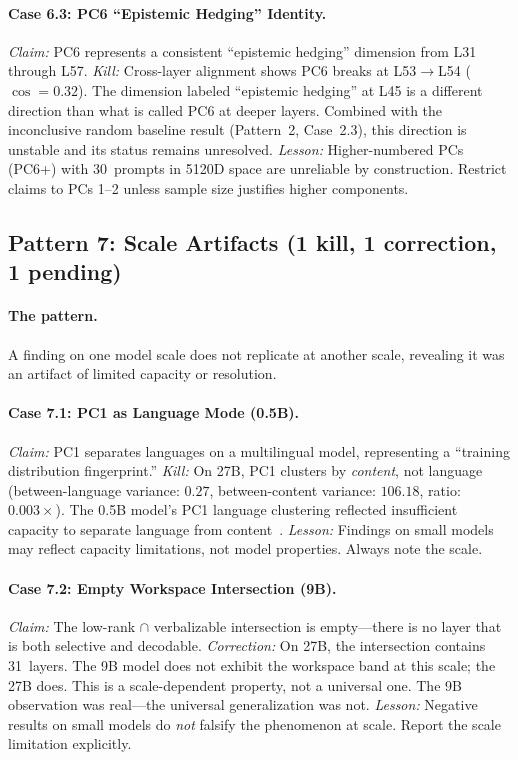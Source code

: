 \documentclass[11pt,a4paper]{article}
\begin{document}
\paragraph{Case 6.3: PC6 ``Epistemic Hedging'' Identity.}
\emph{Claim:} PC6 represents a consistent ``epistemic hedging''
dimension from L31 through L57.
\emph{Kill:} Cross-layer alignment shows PC6 breaks at
L53$\to$L54 ($\cos{=}0.32$). The dimension labeled ``epistemic hedging''
at L45 is a different direction than what is called PC6 at deeper
layers. Combined with the inconclusive random baseline result (Pattern~2,
Case~2.3), this direction is unstable and its status remains unresolved.
\emph{Lesson:} Higher-numbered PCs (PC6+) with 30~prompts in 5120D
space are unreliable by construction. Restrict claims to PCs 1--2 unless
sample size justifies higher components.

\subsection{Pattern 7: Scale Artifacts (1 kill, 1 correction, 1 pending)}

\paragraph{The pattern.} A finding on one model scale does not replicate
at another scale, revealing it was an artifact of limited capacity or
resolution.

\paragraph{Case 7.1: PC1 as Language Mode (0.5B).}
\emph{Claim:} PC1 separates languages on a multilingual model,
representing a ``training distribution fingerprint.''
\emph{Kill:} On 27B, PC1 clusters by \emph{content}, not language
(between-language variance: $0.27$, between-content variance: $106.18$,
ratio: $0.003\times$). The 0.5B model's PC1 language clustering
reflected insufficient capacity to separate language from
content~\citep{wendler2024llamas}.
\emph{Lesson:} Findings on small models may reflect capacity
limitations, not model properties. Always note the scale.

\paragraph{Case 7.2: Empty Workspace Intersection (9B).}
\emph{Claim:} The low-rank $\cap$ verbalizable intersection is
empty---there is no layer that is both selective and decodable.
\emph{Correction:} On 27B, the intersection contains 31~layers. The 9B model
does not exhibit the workspace band at this scale; the 27B does. This is
a scale-dependent property, not a universal one. The 9B observation was
real---the universal generalization was not.
\emph{Lesson:} Negative results on small models do \emph{not} falsify
the phenomenon at scale. Report the scale limitation explicitly.
\end{document}
